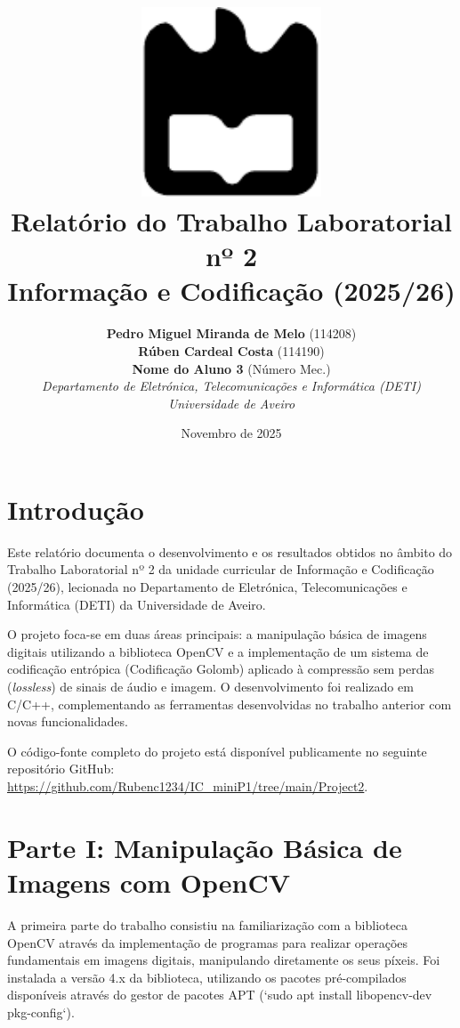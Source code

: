 \documentclass[a4paper, 11pt, portuguese]{article}
\title{
    \includegraphics[width=0.4\textwidth]{imagens/ua.pdf} \\ \vspace{1.5cm}
    \textbf{Relatório do Trabalho Laboratorial nº 2} \\
    \large Informação e Codificação (2025/26)
}
\author{
    \textbf{Pedro Miguel Miranda de Melo} (114208) \\
    \textbf{Rúben Cardeal Costa} (114190) \\
    \textbf{Nome do Aluno 3} (Número Mec.) \\
    \textit{Departamento de Eletrónica, Telecomunicações e Informática (DETI)} \\
    \textit{Universidade de Aveiro}
}
\date{Novembro de 2025}
\begin{document}
\maketitle
\thispagestyle{empty} %

\newpage
\tableofcontents %
\newpage

\section{Introdução}

Este relatório documenta o desenvolvimento e os resultados obtidos no âmbito do Trabalho Laboratorial nº 2 da unidade curricular de Informação e Codificação (2025/26), lecionada no Departamento de Eletrónica, Telecomunicações e Informática (DETI) da Universidade de Aveiro.

O projeto foca-se em duas áreas principais: a manipulação básica de imagens digitais utilizando a biblioteca OpenCV e a implementação de um sistema de codificação entrópica (Codificação Golomb) aplicado à compressão sem perdas (\textit{lossless}) de sinais de áudio e imagem. O desenvolvimento foi realizado em C/C++, complementando as ferramentas desenvolvidas no trabalho anterior com novas funcionalidades.

O código-fonte completo do projeto está disponível publicamente no seguinte repositório GitHub: \url{https://github.com/Rubenc1234/IC_miniP1/tree/main/Project2}.

\section{Parte I: Manipulação Básica de Imagens com OpenCV}

A primeira parte do trabalho consistiu na familiarização com a biblioteca OpenCV através da implementação de programas para realizar operações fundamentais em imagens digitais, manipulando diretamente os seus píxeis. Foi instalada a versão 4.x da biblioteca, utilizando os pacotes pré-compilados disponíveis através do gestor de pacotes APT (`sudo apt install libopencv-dev pkg-config`).
\end{document}
